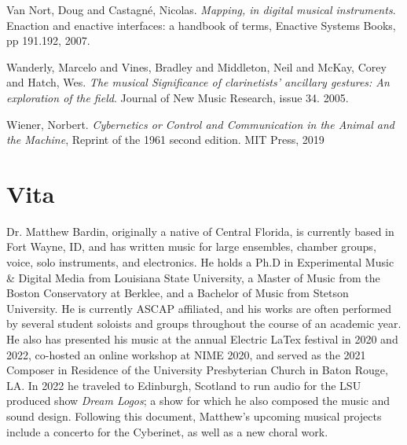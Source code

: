 \begin{thebibliography}{99}
 Van Nort, Doug and Castagné, Nicolas. \emph{Mapping, in digital musical instruments}. Enaction and enactive interfaces: a handbook of terms, Enactive Systems Books, pp 191.192, 2007.

 Wanderly, Marcelo and Vines, Bradley and Middleton, Neil and McKay, Corey and Hatch, Wes. \emph{The musical Significance of clarinetists' ancillary gestures: An exploration of the field}. Journal of New Music Research, issue 34. 2005.

 Wiener, Norbert. \emph{Cybernetics or Control and Communication in the Animal and the Machine}, Reprint of the 1961 second edition. MIT Press, 2019




\end{thebibliography}


\chapter{Vita}

Dr. Matthew Bardin, originally a native of Central Florida, is currently based in Fort Wayne, ID, and has written music for large ensembles, chamber groups, voice, solo instruments, and electronics. He holds a Ph.D in Experimental Music \& Digital Media from Louisiana State University, a Master of Music from the Boston Conservatory at Berklee, and a  Bachelor of Music from Stetson University. He is currently ASCAP affiliated, and his works are often performed by several student soloists and groups throughout the course of an academic year. He also has presented his music at the annual Electric LaTex festival in 2020 and 2022, co-hosted an online workshop at NIME 2020, and served as the 2021 Composer in Residence of the University Presbyterian Church in Baton Rouge, LA. In 2022 he traveled to Edinburgh, Scotland to run audio for the LSU produced show \textit{Dream Logos}; a show for which he also composed the music and sound design. Following this document, Matthew's upcoming musical projects include a concerto for the Cyberinet, as well as a new choral work.

